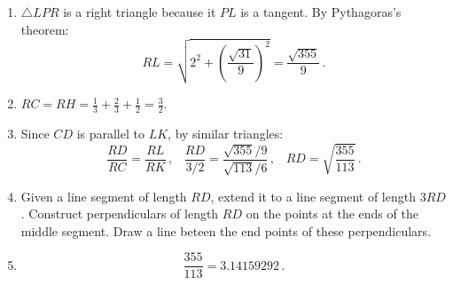 \begin{enumerate}
\item $\triangle LPR$ is a right triangle because it $PL$ is a tangent. By Pythagoras's theorem:
\[
RL=\sqrt{2^2+\left(\frac{\sqrt{31}}{9}\right)^2} = \frac{\sqrt{355}}{9}\,.
\]

\item $RC=RH=\displaystyle\frac{1}{3}+\frac{2}{3}+\frac{1}{2}=\frac{3}{2}$.

\item Since $CD$ is parallel to $LK$, by similar triangles:
\[
\frac{RD}{RC}=\frac{RL}{RK}\,,\;\;\;\frac{RD}{3/2}=\frac{\sqrt{355}/9}{\sqrt{113}/6}\,,\;\;\;RD=\sqrt{\frac{355}{113}}\,.
\]

\item Given a line segment of length $RD$, extend it to a line segment of length $3RD$. Construct perpendiculars of length $RD$ on the points at the ends of the middle segment. Draw a line beteen the end points of these perpendiculars.

\begin{center}
\end{center}

\item \mbox{}
\[
\frac{355}{113}=3.14159292\,.
\]

\end{enumerate}

